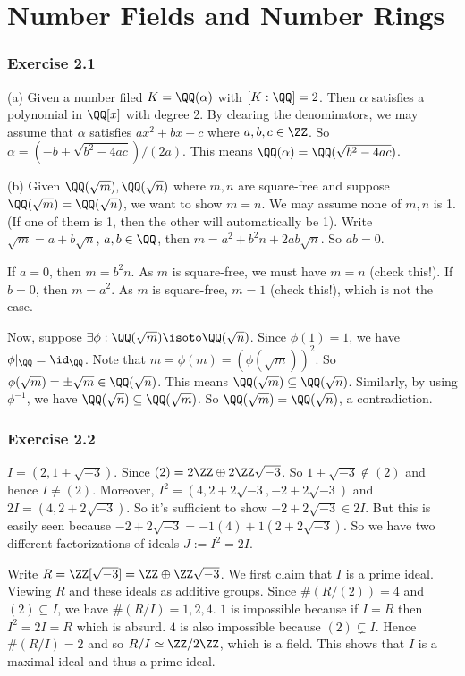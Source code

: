 \documentclass[../Chapter.tex]{subfiles}
\begin{document}
	
\chapter{Number Fields and Number Rings}

\subsection*{Exercise 2.1}

(a) Given a number filed $K=\QQ(\alpha)$ with $[K:\QQ]=2$. Then $\alpha$ satisfies a polynomial in $\QQ[x]$ with degree 2. By clearing the denominators, we may assume that $\alpha$ satisfies $ax^2+bx+c$ where $a,b,c\in \ZZ$. So $\alpha=(-b\pm \sqrt{b^2-4ac})/(2a)$. This means $\QQ(\alpha)=\QQ(\sqrt{b^2-4ac})$.

(b) Given $\QQ(\sqrt{m}),\QQ(\sqrt{n})$ where $m,n$ are square-free and suppose $\QQ(\sqrt{m})=\QQ(\sqrt{n})$, we want to show $m=n$. We may assume none of $m,n$ is 1. (If one of them is 1, then the other will automatically be 1). Write $\sqrt{m}=a+b\sqrt{n}$, $a,b\in\QQ$, then $m=a^2+b^2n+2ab\sqrt{n}$. So $ab=0$.

If $a=0$, then $m=b^2n$. As $m$ is square-free, we must have $m=n$ (check this!). If $b=0$, then $m=a^2$. As $m$ is square-free, $m=1$ (check this!), which is not the case.

Now, suppose $\exists \phi:\QQ(\sqrt{m})\isoto\QQ(\sqrt{n})$. Since $\phi(1)=1$, we have $\phi |_\QQ=\id_\QQ$. Note that $m=\phi(m)=(\phi(\sqrt{m}))^2$. So $\phi(\sqrt{m})=\pm \sqrt{m}\in \QQ(\sqrt{n})$. This means $\QQ(\sqrt{m})\subseteq\QQ(\sqrt{n})$. Similarly, by using $\phi^{-1}$, we have $\QQ(\sqrt{n})\subseteq\QQ(\sqrt{m})$. So $\QQ(\sqrt{m})=\QQ(\sqrt{n})$, a contradiction.

\subsection*{Exercise 2.2}

$I=(2,1+\sqrt{-3})$. Since $(2)=2\ZZ\oplus2\ZZ\sqrt{-3}$. So $1+\sqrt{-3}\notin(2)$ and hence $I\neq(2)$. Moreover, $I^2=(4,2+2\sqrt{-3},-2+2\sqrt{-3})$ and $2I=(4,2+2\sqrt{-3})$. So it's sufficient to show $-2+2\sqrt{-3}\in 2I$. But this is easily seen because $-2+2\sqrt{-3}=-1(4)+1(2+2\sqrt{-3})$. So we have two different factorizations of ideals $J:=I^2=2I$.

Write $R=\ZZ[\sqrt{-3}]=\ZZ\oplus\ZZ\sqrt{-3}$. We first claim that $I$ is a prime ideal. Viewing $R$ and these ideals as additive groups. Since $\#(R/(2))=4$ and $(2)\subseteq I$, we have $\#(R/I)=1,2,4$. $1$ is impossible because if $I=R$ then $I^2=2I=R$ which is absurd. $4$ is also impossible because $(2)\varsubsetneq I$. Hence $\#(R/I)=2$ and so $R/I\simeq \ZZ/2\ZZ$, which is a field. This shows that $I$ is a maximal ideal and thus a prime ideal.
\end{document}
